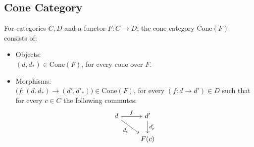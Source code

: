 \subsection{Cone Category}
For categories $C, D$ and a functor $F:C\to D$, the cone category
$\mathrm{Cone}(F)$ consists of: \parencite{fong_spivak:7sketches}

\begin{itemize}
  \item Objects:\\
    $(d, d_*) \in \mathrm{Cone}(F)$, for every cone over $F$.
  \item Morphisms:\\
    $\big(f: (d, d_*) \to (d', d'_*) \big) \in \mathrm{Cone}(F)$, for every
    $(f:d\to d')\in D$ such that for every $c\in C$ the following commutes:
    \[\begin{tikzcd}
      d & {d'} \\
      & {F(c)}
      \arrow["{d_c}"', from=1-1, to=2-2]
      \arrow["{d'_c}", from=1-2, to=2-2]
      \arrow["f", from=1-1, to=1-2]
    \end{tikzcd}\]
\end{itemize}